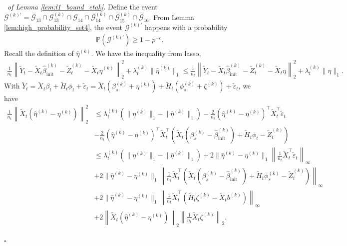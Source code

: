 \documentclass[12pt]{article}
\newenvironment{pf}{{\noindent \it Proof}\ }{\hfill $\square$\par}
\begin{document}
\begin{pf}{\it of Lemma \ref{lem:l1_bound_etak}. }
    Define the event $\mathcal{G}^{(k)'} = \mathcal{G}_{13}\cap\mathcal{G}_{13}^{(k)}\cap \mathcal{G}_{14}\cap\mathcal{G}_{14}^{(k)}\cap \mathcal{G}_{15}^{(k)}\cap \mathcal{G}_{16}$. From Lemma \ref{lem:high_probability_set4}, the event $\mathcal{G}^{(k)'}$ happens with a probability 
    \begin{align*}
        \mathbb{P}(\mathcal{G}^{(k)'}) \ge 1- p^{-c}. 
    \end{align*}
     Recall the definition of $\hat{\eta}^{(k)}$. We have the inequality from lasso,
    \begin{align*}
        \frac{1}{n_t}\left\|\tilde{Y}_t - \tilde{X}_t \hat{\beta}_{\text{init}}^{(k)} - \tilde{Z}_t^{(k)} -\tilde{X}_t \hat{\eta}^{(k)}\right\|_2^2 + \lambda_t^{(k)}\|\hat{\eta}^{(k)}\|_1 \le \frac{1}{n_t}\left\|\tilde{Y}_t - \tilde{X}_t \hat{\beta}_{\text{init}}^{(k)} - \tilde{Z}_t^{(k)} - \tilde{X}_t\eta\right\|_2^2 + \lambda_t^{(k)}\|\eta\|_1.  
    \end{align*}
    With $\tilde{Y}_t = \tilde{X}_t\beta_t +\tilde{H}_t\phi_t+ \tilde{\varepsilon}_t = \tilde{X}_t(\beta_s^{(k)} +\eta^{(k)}) + \tilde{H}_t(\phi_s^{(k)} +\zeta^{(k)})+ \tilde{\varepsilon}_t$, we have
    \begin{align*}
        \frac{1}{n_t}\left\|\tilde{X}_t(\hat{\eta}^{(k)} - \eta^{(k)})\right\|_2^2 & \le
        \lambda_t^{(k)}(\|\eta^{(k)}\|_1 - \|\hat{\eta}^{(k)}\|_1) -  \frac{2}{n_t}(\hat{\eta}^{(k)} - \eta^{(k)})^\top\tilde{X}_t^\top \tilde{\varepsilon}_t \\& - \frac{2}{n_t}(\hat{\eta}^{(k)} - \eta^{(k)})^\top \tilde{X}_t^\top \left(\tilde{X}_t\left(\beta_s^{(k)}-\hat{\beta}_{\text{init}}^{(k)}\right) +\tilde{H}_t\phi_t - \tilde{Z}_t^{(k)}\right) \\& \le 
        \lambda_t^{(k)}(\|\eta^{(k)}\|_1 - \|\hat{\eta}^{(k)}\|_1) + 2\|\hat{\eta}^{(k)} - \eta^{(k)}\|_1 \left\|\frac{1}{n_t}\tilde{X}_t^\top \tilde{\varepsilon}_t\right\|_{\infty} \\& +
        2\|\hat{\eta}^{(k)} - \eta^{(k)}\|_1 \left\|\frac{1}{n_t}\tilde{X}_t^\top\left(\tilde{X}_t\left(\beta_s^{(k)}-\hat{\beta}_{\text{init}}^{(k)}\right) +\tilde{H}_t\phi_s^{(k)}- \tilde{Z}_t^{(k)}\right)\right\|_{\infty}\\& + 
        2\|\hat{\eta}^{(k)} - \eta^{(k)}\|_1 \left\|\frac{1}{n_t}\tilde{X}_t^\top \left(\tilde{H}_t\zeta^{(k)}-\tilde{X}_t b^{(k)}\right)\right\|_{\infty}\\& +
        2\left\|\tilde{X}_t(\hat{\eta}^{(k)} - \eta^{(k)})\right\|_2 \left\|\frac{1}{n_t}\tilde{X}_t\zeta^{(k)}\right\|_{2}.
    \end{align*}
    

\end{pf}
\end{document}
